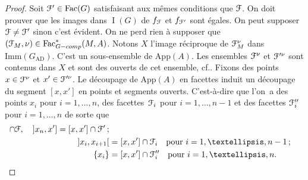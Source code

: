 \documentclass[11pt]{article}
\newcommand{\cf}{cf.\xspace}
\numberwithin{equation}{section}\providecommand{\og}{«\,}\providecommand{\fg}{\,»}
\let\mathcal \EuScript
\newcommand{\AD}{\mathrm{AD}}
\newcommand{\App}{\mathrm{App}}
\newcommand{\tcomp}{\textup{-comp}}
\newcommand{\Fac}{\mathrm{Fac}}
\newcommand{\Imm}{\mathrm{Imm}}
\DeclareMathOperator{\rI}{I}
\newcommand{\cF}{\mathcal{F}}
\theoremstyle{plain}
\theoremstyle{definition}
\begin{document}
\begin{proof}
Soit $\cF'\in \Fac(G)$ satisfaisant aux mêmes conditions que $\cF$. On doit prouver que les images dans $\rI(G)$ de $f_{\cF}$ et $f_{\cF'}$ sont égales. On peut supposer $\cF\neq\cF'$ sinon c'est évident. On ne perd rien à supposer que $(\cF_{M},\nu)\in \Fac^*_{G\tcomp}(M,A)$. Notons $X$ l'image réciproque de $\cF^{\nu}_{M}$ dans $\Imm(G_{\AD})$. C'est un sous-ensemble de $\App(A)$. Les ensembles $\cF^{\nu}$ et $\cF^{\prime\nu}$ sont contenus dans $X$ et sont des ouverts de cet ensemble, \cf \cite[Lem.\,7]{W2}. Fixons des points $x\in \cF^{\nu}$ et $x'\in \cF^{\prime\nu}$. Le découpage de $\App(A)$ en facettes induit un découpage du segment $[x,x']$ en points et segments ouverts. C'est-à-dire que l'on~a des points $x_{i}$ pour $i=1,\dots,n$, des facettes~$\cF_{i}$ pour $i=1,\dots,n-1$ et des facettes $\cF''_{i}$ pour $i=1,\dots,n$ de sorte que
\begin{align*}
[x,x_{1}[{}&=[x,x']\cap \cF,\quad ]x_{n},x']=[x,x']\cap \cF'\,;\\
]x_{i},x_{i+1}[{}&=[x,x']\cap \cF_{i}\quad\text{pour }i=1,\dots,n-1\,;\\
\{x_{i}\}&=[x,x']\cap \cF''_{i}\quad\text{pour }i=1,\dots,n.
\end{align*}


\end{proof}
\end{document}
